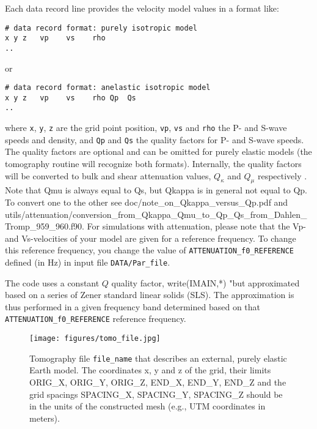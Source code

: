 \noindent
Each data record line provides the velocity model values in a format like:
{\small
\begin{verbatim}
# data record format: purely isotropic model
x y z   vp    vs    rho
..
\end{verbatim}
}
\noindent
or
{\small
\begin{verbatim}
# data record format: anelastic isotropic model
x y z   vp    vs    rho Qp  Qs
..
\end{verbatim}
}
\noindent
where  \texttt{x}, \texttt{y}, \texttt{z} are the grid point position, \texttt{vp}, \texttt{vs} and \texttt{rho} the P- and S-wave speeds and density, and \texttt{Qp} and \texttt{Qs} the quality factors for P- and S-wave speeds. The quality factors are optional and can be omitted for purely elastic models (the tomography routine will recognize both formats). Internally, the quality factors will be converted to bulk and shear attenuation values,
$Q_{\kappa}$ and $Q_{\mu}$ respectively \citep{AnHa78}.
Note that Qmu is always equal to Qs, but Qkappa is in general not equal to Qp. To convert one to the other see doc/note\_on\_Qkappa\_versus\_Qp.pdf and utils/attenuation/conversion\_from\_Qkappa\_Qmu\_to\_Qp\_Qs\_from\_Dahlen\_Tromp\_959\_960.f90.
For simulations with attenuation, please note that the Vp- and Vs-velocities of your model are given for a reference
frequency. To change this reference frequency, you change the value
of \texttt{ATTENUATION\_f0\_REFERENCE} defined (in Hz) in input file \texttt{DATA/Par\_file}.

The code uses a constant $Q$ quality factor, write(IMAIN,*) "but approximated based on a series of Zener standard linear solids (SLS).
The approximation is thus performed in a given frequency band determined based on that \texttt{ATTENUATION\_f0\_REFERENCE} reference frequency.

\begin{figure}[htbp]
\noindent \begin{centering}
\texttt{[image: figures/tomo\_file.jpg]}
\par\end{centering}

\caption{Tomography file \texttt{file\_name} that describes an external, purely elastic Earth
model. The coordinates x, y and z of the grid, their limits ORIG\_X,
ORIG\_Y, ORIG\_Z, END\_X, END\_Y, END\_Z and the grid spacings SPACING\_X,
SPACING\_Y, SPACING\_Z should be in the units of the constructed mesh
(e.g., UTM coordinates in meters).}


\label{fig:tomography_file}
\end{figure}


